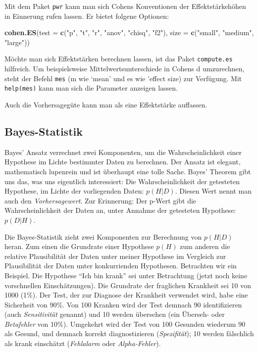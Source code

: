 \documentclass[12pt,ngerman,]{book}
\makeatletter
\newenvironment{Shaded}{\begin{snugshade}}{\end{snugshade}}
\newcommand{\KeywordTok}[1]{\textcolor[rgb]{0.13,0.29,0.53}{\textbf{{#1}}}}
\newcommand{\DataTypeTok}[1]{\textcolor[rgb]{0.13,0.29,0.53}{{#1}}}
\newcommand{\StringTok}[1]{\textcolor[rgb]{0.31,0.60,0.02}{{#1}}}
\newcommand{\NormalTok}[1]{{#1}}
\newenvironment{kframe}{%
\medskip{}
\setlength{\fboxsep}{.8em}
 \def\at@end@of@kframe{}%
 \ifinner\ifhmode%
  \def\at@end@of@kframe{\end{minipage}}%
  \begin{minipage}{\columnwidth}%
 \fi\fi%
 \def\FrameCommand##1{\hskip\@totalleftmargin \hskip-\fboxsep
 \colorbox{shadecolor}{##1}\hskip-\fboxsep
     \hskip-\linewidth \hskip-\@totalleftmargin \hskip\columnwidth}%
 \MakeFramed {\advance\hsize-\width
   \@totalleftmargin\z@ \linewidth\hsize
   \@setminipage}}%
 {\par\unskip\endMakeFramed%
 \at@end@of@kframe}
\renewenvironment{Shaded}{\begin{kframe}}{\end{kframe}}
\theoremstyle{definition}
\theoremstyle{definition}
\theoremstyle{remark}
\makeatother
\begin{document}
Mit dem Paket \texttt{pwr} kann man sich Cohens Konventionen der
Effektstärkehöhen in Einnerung rufen lassen. Er bietet folgene Optionen:

\begin{Shaded}
\begin{Highlighting}[]
\KeywordTok{cohen.ES}\NormalTok{(}\DataTypeTok{test =} \KeywordTok{c}\NormalTok{(}\StringTok{"p"}\NormalTok{, }\StringTok{"t"}\NormalTok{, }\StringTok{"r"}\NormalTok{, }\StringTok{"anov"}\NormalTok{, }\StringTok{"chisq"}\NormalTok{, }\StringTok{"f2"}\NormalTok{),}
    \DataTypeTok{size =} \KeywordTok{c}\NormalTok{(}\StringTok{"small"}\NormalTok{, }\StringTok{"medium"}\NormalTok{, }\StringTok{"large"}\NormalTok{))}
\end{Highlighting}
\end{Shaded}

Möchte man sich Effektstärken berechnen lassen, ist das Paket
\texttt{compute.es} hilfreich. Um beispielsweise Mittelwertsunterschiede
in Cohens d umzurechnen, steht der Befehl \texttt{mes} (m wie `mean' und
es wie 'effect size) zur Verfügung. Mit \texttt{help(mes)} kann man sich
die Parameter anzeigen lassen.

Auch die Vorhersagegüte kann man als eine Effektstärke auffassen.

\subsection{Bayes-Statistik}\label{bayes-statistik}

Bayes' Ansatz verrechnet zwei Komponenten, um die Wahrscheinlichkeit
einer Hypothese im Lichte bestimmter Daten zu berechnen. Der Ansatz ist
elegant, mathematisch lupenrein und ist überhaupt eine tolle Sache.
Bayes' Theorem gibt uns das, was uns eigentlich interessiert: Die
Wahrscheinlichkeit der getesteten Hypothese, im Lichte der vorliegenden
Daten: \(p(H|D)\). Diesen Wert nennt man auch den \emph{Vorhersagewert}.
Zur Erinnerung: Der p-Wert gibt die Wahrscheinlichkeit der Daten an,
unter Annahme der getesteten Hypothese: \(p(D|H)\).

Die Bayes-Statistik zieht zwei Komponenten zur Berechnung von \(p(H|D)\)
heran. Zum einen die Grundrate einer Hypothese \(p(H)\) zum anderen die
relative Plausibilität der Daten unter meiner Hypothese im Vergleich zur
Plausibilität der Daten unter konkurrienden Hypothesen. Betrachten wir
ein Beispiel. Die Hypothese ``Ich bin krank'' sei unter Betrachtung
(jetzt noch keine vorschnellen Einschätzungen). Die Grundrate der
fraglichen Krankheit sei 10 von 1000 (1\%). Der Test, der zur Diagnose
der Krankheit verwendet wird, habe eine Sicherheit von 90\%. Von 100
Kranken wird der Test demnach 90 identifizieren (auch
\emph{Sensitivität} genannt) und 10 werden übersehen (ein Überseh- oder
\emph{Betafehler} von 10\%). Umgekehrt wird der Test von 100 Gesunden
wiederum 90 als Gesund, und demnach korrekt diagnostizieren
(\emph{Spezifität}); 10 werden fälschlich als krank einschätzt
(\emph{Fehlalarm} oder \emph{Alpha-Fehler}).
\end{document}
